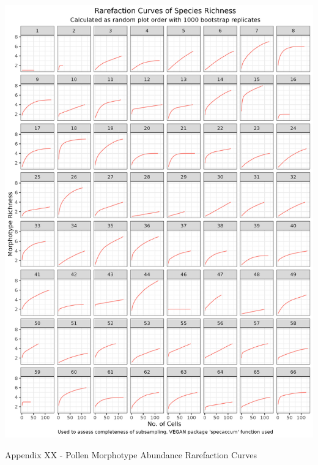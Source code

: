 \documentclass[
]{article}
\begin{document}
\includegraphics[width=0.95\linewidth]{../graphics/plots/species_richness_rarefaction}

\newpage

Appendix XX - Pollen Morphotype Abundance Rarefaction Curves
\end{document}
